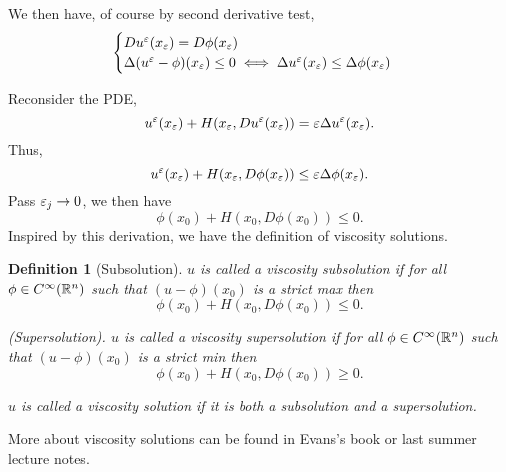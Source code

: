 \documentclass[11pt, oneside]{amsart}   	%
\newtheorem{definition}{Definition}
\begin{document}
We then have, of course by second derivative test,
$$\begin{cases}
	Du^\varepsilon(x_\varepsilon)=D\phi(x_\varepsilon)\\
	\Delta(u^\varepsilon - \phi)(x_\varepsilon)\le 0 \iff \Delta u^\varepsilon(x_\varepsilon)\le \Delta\phi(x_\varepsilon)
\end{cases}$$

Reconsider the PDE,
	$$u^\varepsilon(x_\varepsilon) + H(x_\varepsilon, Du^\varepsilon(x_\varepsilon))=\varepsilon \Delta u^\varepsilon(x_\varepsilon).$$
	Thus,
	$$u^\varepsilon(x_\varepsilon) + H(x_\varepsilon, D\phi(x_\varepsilon))\le \varepsilon \Delta\phi(x_\varepsilon).$$
	Pass $\varepsilon_j\to 0$, we then have
	$$\phi(x_0)+ H(x_0, D\phi(x_0))\le 0.$$
	Inspired by this derivation, we have the definition of viscosity solutions.
	
\begin{definition}[Subsolution]
	$u$ is called a viscosity subsolution if for all $\phi\in C^\infty(\mathbb{R}^n)$ such that $(u-\phi)(x_0)$ is a strict max then $$\phi(x_0) + H(x_0, D\phi(x_0))\le 0.$$
	
	(Supersolution). $u$ is called a viscosity supersolution if for all $\phi\in C^\infty(\mathbb{R}^n)$ such that $(u-\phi)(x_0)$ is a strict min then $$\phi(x_0) + H(x_0, D\phi(x_0))\ge 0.$$
	
	$u$ is called a viscosity solution if it is both a subsolution and a supersolution.
\end{definition}
More about viscosity solutions can be found in Evans's book or last summer lecture notes.
\end{document}
